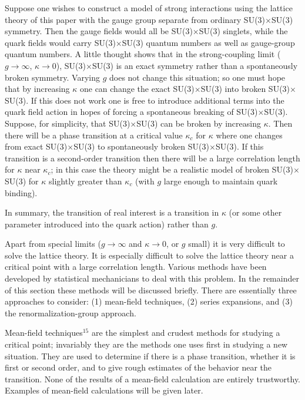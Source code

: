 Suppose one wishes to construct a model of strong interactions using the
lattice theory of this paper with the gauge group separate from ordinary
SU(3)$\times$SU(3) symmetry.  Then the gauge fields would all be
SU(3)$\times$SU(3) singlets, while the quark fields would carry
SU(3)$\times$SU(3) quantum numbers as well as gauge-group quantum
numbers.  A little thought shows that in the strong-coupling limit
($g\to\infty$, $\kappa\to0$), SU(3)$\times$SU(3) is an exact symmetry
rather than a spontaneously broken symmetry.  Varying $g$ does not change
this situation; so one must hope that by increasing $\kappa$ one can
change the exact SU(3)$\times$SU(3) into broken SU(3)$\times$SU(3).  If
this does not work one is free to introduce additional terms into the
quark field action in hopes of forcing a spontaneous breaking of
SU(3)$\times$SU(3).  Suppose, for simplicity, that SU(3)$\times$SU(3)
can be broken by increasing $\kappa$.  Then there will be a phase
transition at a critical value $\kappa_{c}$ for $\kappa$ where one changes
from exact SU(3)$\times$SU(3) to spontaneously broken
SU(3)$\times$SU(3).  If this transition is a second-order transition then
there will be a large correlation length for $\kappa$ near $\kappa_{c}$;
in this case the theory might be a realistic model of broken
SU(3)$\times$SU(3) for $\kappa$ slightly greater than $\kappa_{c}$ (with
$g$ large enough to maintain quark binding).

In summary, the transition of real interest is a transition in $\kappa$
(or some other parameter introduced into the quark action) rather than
$g$.

Apart from special limits ($g\to\infty$ and $\kappa\to0$, or $g$ small)
it is very difficult to solve the lattice theory.  It is especially
difficult to solve the lattice theory near a critical point with a large
correlation length.  Various methods have been developed by statistical
mechanicians to deal with this problem.  In the remainder of this section
these methods will be discussed briefly.  There are essentially three
approaches to consider:  (1) mean-field techniques, (2) series
expansions, and (3) the renormalization-group approach.

Mean-field techniques${}^{15}$ are the simplest and crudest methods for
studying a critical point; invariably they are the methods one uses
first in studying a new situation.  They are used to determine if there
is a phase transition, whether it is first or second order, and to give
rough estimates of the behavior near the transition.  None of the
results of a mean-field calculation are entirely trustworthy.  Examples
of mean-field calculations will be given later.

